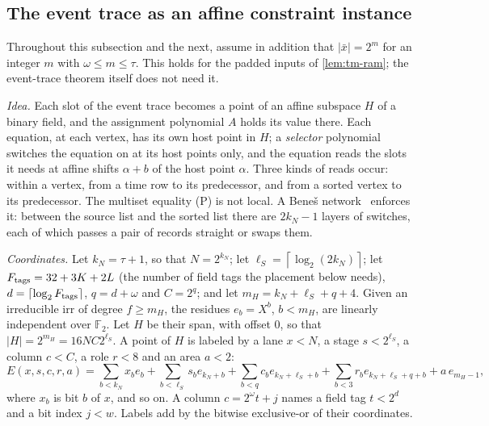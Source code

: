 \documentclass[11pt,letterpaper]{article}
\theoremstyle{definition}
\theoremstyle{remark}
\newcommand{\ceil}[1]{\left\lceil #1\right\rceil}
\newcommand{\abs}[1]{\left|#1\right|}
\newcommand{\lgx}{\log_2}
\begin{document}
\subsection{The event trace as an affine constraint instance}\label{app:affine-embedding}

Throughout this subsection and the next, assume in addition that
\(\abs{\bar x}=2^m\) for an integer \(m\) with \(\omega\le m\le\tau\).
This holds for the padded inputs of \cref{lem:tm-ram}; the event-trace
theorem itself does not need it.

\emph{Idea.} Each slot of the event trace becomes a point of an affine
subspace \(H\) of a binary field, and the assignment polynomial \(A\)
holds its value there. Each equation, at each vertex, has its own host point in \(H\); a
\emph{selector} polynomial switches the equation on at its host points
only, and the equation reads the slots it needs at affine shifts
\(\alpha+b\) of the host point \(\alpha\). Three kinds of reads occur: within a
vertex, from a time row to its predecessor, and from a sorted vertex to
its predecessor. The multiset equality (P) is not local. A Beneš
network~\cite{Ben65} enforces it: between the source list and the sorted list there
are \(2k_N-1\) layers of switches, each of which passes a pair of
records straight or swaps them.

\emph{Coordinates.} Let \(k_N=\tau+1\), so that \(N=2^{k_N}\); let
\(\ell_S=\ceil{\lgx(2k_N)}\); let \(F_{\rm tags}=32+3K+2L\) (the number
of field tags the placement below needs),
\(d=\ceil{\lgx F_{\rm tags}}\), \(q=d+\omega\) and \(C=2^q\); and let
\(m_H=k_N+\ell_S+q+4\). Given an irreducible \(\mathrm{irr}\) of degree
\(f\ge m_H\), the residues \(e_b=X^b\), \(b<m_H\), are linearly
independent over \(\mathbb F_2\). Let \(H\) be their span, with offset
\(0\), so that \(\abs H=2^{m_H}=16NC2^{\ell_S}\). A point of \(H\) is
labeled by a lane \(x<N\), a stage \(s<2^{\ell_S}\), a column \(c<C\), a
role \(r<8\) and an area \(a<2\):
\[
 E(x,s,c,r,a)=\sum_{b<k_N}x_be_b+\sum_{b<\ell_S}s_be_{k_N+b}
 +\sum_{b<q}c_be_{k_N+\ell_S+b}+\sum_{b<3}r_be_{k_N+\ell_S+q+b}
 +a\,e_{m_H-1},
\]
where \(x_b\) is bit \(b\) of \(x\), and so on. A column \(c=2^\omega
t+j\) names a field tag \(t<2^d\) and a bit index \(j<w\). Labels add by
the bitwise exclusive-or of their coordinates.
\end{document}
